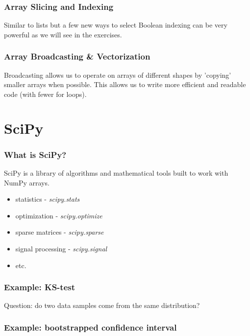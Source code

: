 \documentclass{beamer}
\begin{document}
\begin{frame}
\frametitle{Array Slicing and Indexing}
Similar to lists but a few new ways to select
\lstset{basicstyle=\scriptsize}
Boolean indexing can be very powerful as we will see in the exercises.
\end{frame}

\begin{frame}
\frametitle{Array Broadcasting \& Vectorization}
Broadcasting allows us to operate on arrays of different shapes by 'copying' smaller arrays when possible. This allows us to write more efficient and readable code (with fewer for loops).
\end{frame}


\section{SciPy}

\begin{frame}
\frametitle{What is SciPy?}
SciPy is a library of algorithms and mathematical tools built to work with NumPy arrays.
\vspace{0.2in}
\begin{itemize}
\setlength{\itemsep}{0.1in}
\item{statistics - \textit{scipy.stats}}
\item{optimization - \textit{scipy.optimize}}
\item{sparse matrices - \textit{scipy.sparse}}
\item{signal processing - \textit{scipy.signal}}
\item{etc.}
\end{itemize}
\end{frame}


\begin{frame}
\frametitle{Example: KS-test}
Question: do two data samples come from the same distribution?
\lstset{basicstyle=\scriptsize}
\end{frame}

\begin{frame}
\lstset{basicstyle=\scriptsize}
\frametitle{Example: bootstrapped confidence interval}
\end{frame}

\end{document}
